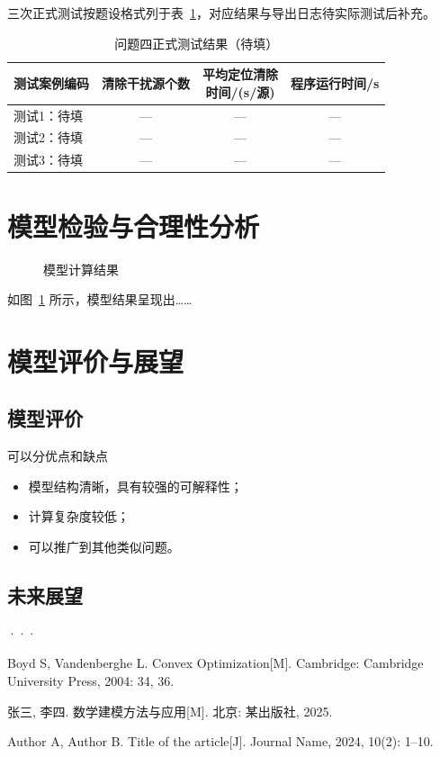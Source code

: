 \documentclass[UTF8,a4paper,12pt]{ctexart}
\begin{document}
三次正式测试按题设格式列于表~\ref{tab:q4-official}，对应结果与导出日志待实际测试后补充。
\begin{table}[htbp]
  \centering
  \caption{问题四正式测试结果（待填）}
  \label{tab:q4-official}
  \small
  \renewcommand{\arraystretch}{1.25}
  \begin{tabularx}{0.96\linewidth}{Xccc}
    \toprule
    测试案例编码 & 清除干扰源个数 & \shortstack{平均定位清除\\时间/(s/源)} & 程序运行时间/s \\
    \midrule
    测试1：待填 & --- & --- & --- \\
    测试2：待填 & --- & --- & --- \\
    测试3：待填 & --- & --- & --- \\
    \bottomrule
  \end{tabularx}
\end{table}

\section{模型检验与合理性分析}

\begin{figure}[htbp]
  \centering
  \caption{模型计算结果}
  \label{fig:result}
\end{figure}

如图~\ref{fig:result} 所示，模型结果呈现出……

\section{模型评价与展望}

\subsection{模型评价}
可以分优点和缺点

\begin{itemize}
  \item 模型结构清晰，具有较强的可解释性；
  \item 计算复杂度较低；
  \item 可以推广到其他类似问题。
\end{itemize}

\subsection{未来展望}
···


\begin{thebibliography}{99}

Boyd S, Vandenberghe L.
Convex Optimization[M].
Cambridge: Cambridge University Press, 2004: 34, 36.

张三, 李四.
数学建模方法与应用[M].
北京: 某出版社, 2025.

Author A, Author B.
Title of the article[J].
Journal Name, 2024, 10(2): 1--10.

\end{thebibliography}
\end{document}
